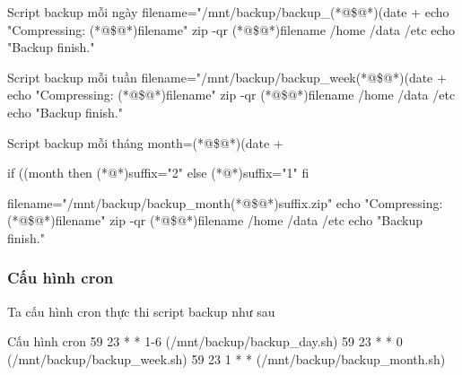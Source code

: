 
\begin{coding}{Script backup mỗi ngày}
  filename="/mnt/backup/backup_(*@\textcolor{bashred}{\$}@*)(date + %
  echo "Compressing: (*@\textcolor{bashred}{\$}@*)filename"
  zip -qr (*@\$@*)filename /home /data /etc
  echo "Backup finish."
\end{coding}


\begin{coding}{Script backup mỗi tuần}
  filename="/mnt/backup/backup_week(*@\textcolor{bashred}{\$}@*)(date + %
  echo "Compressing: (*@\textcolor{bashred}{\$}@*)filename"
  zip -qr (*@\$@*)filename /home /data /etc
  echo "Backup finish."
\end{coding}


\begin{coding}{Script backup mỗi tháng}
  month=(*@\$@*)(date + %

  if ((month %
  then
  (*@\qquad@*)suffix="2"
  else
  (*@\qquad@*)suffix="1"
  fi

  filename="/mnt/backup/backup_month(*@\textcolor{bashred}{\$}@*)suffix.zip"
  echo "Compressing: (*@\textcolor{bashred}{\$}@*)filename"
  zip -qr (*@\$@*)filename /home /data /etc
  echo "Backup finish."
\end{coding}


\subsubsection{Cấu hình cron}

Ta cấu hình cron thực thi script backup như sau


\begin{coding}{Cấu hình cron}
  59  23  *   *   1-6 (/mnt/backup/backup_day.sh)
  59  23  *   *   0   (/mnt/backup/backup_week.sh)
  59  23  1   *   *   (/mnt/backup/backup_month.sh)
\end{coding}
